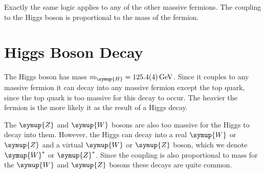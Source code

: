 \documentclass[fleqn]{NotesClass}
\newcommand{\Pparticle}[1]{\symup{#1}}
\newcommand{\PZ}{\ensuremath{\Pparticle{Z}}}
\newcommand{\PW}{\ensuremath{\Pparticle{W}}}
\newcommand{\Phiggs}{\ensuremath{\Pparticle{H}}}
\begin{document}
    Exactly the same logic applies to any of the other massive fermions.
    The coupling to the Higgs boson is proportional to the mass of the fermion.
    
    \section{Higgs Boson Decay}
    The Higgs boson has mass \(m_{\Phiggs} = \qty{125.4(4)}{\giga\electronvolt}\).
    Since it couples to any massive fermion it can decay into any massive fermion except the top quark, since the top quark is too massive for this decay to occur.
    The heavier the fermion is the more likely it as the result of a Higgs decay.
    
    The \PZ{} and \PW{} bosons are also too massive for the Higgs to decay into them.
    However, the Higgs can decay into a real \PW{} or \PZ{} and a virtual \PW{} or \PZ{} boson, which we denote \(\PW^*\) or \(\PZ^*\).
    Since the coupling is also proportional to mass for the \PW{} and \PZ{} bosons these decays are quite common.
    
\end{document}
